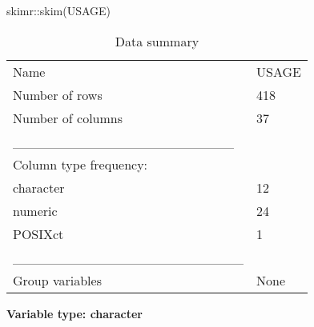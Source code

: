 \documentclass[
]{article}
\newenvironment{Shaded}{\begin{snugshade}}{\end{snugshade}}
\newcommand{\FunctionTok}[1]{\textcolor[rgb]{0.00,0.00,0.00}{#1}}
\newcommand{\NormalTok}[1]{#1}
\newcommand{\SpecialCharTok}[1]{\textcolor[rgb]{0.00,0.00,0.00}{#1}}
\begin{document}
\begin{Shaded}
\begin{Highlighting}[]
\NormalTok{skimr}\SpecialCharTok{::}\FunctionTok{skim}\NormalTok{(USAGE)}
\end{Highlighting}
\end{Shaded}

\begin{longtable}[]{@{}ll@{}}
\caption{Data summary}\tabularnewline
\toprule()
\endhead
Name & USAGE \\
Number of rows & 418 \\
Number of columns & 37 \\
\_\_\_\_\_\_\_\_\_\_\_\_\_\_\_\_\_\_\_\_\_\_\_ & \\
Column type frequency: & \\
character & 12 \\
numeric & 24 \\
POSIXct & 1 \\
\_\_\_\_\_\_\_\_\_\_\_\_\_\_\_\_\_\_\_\_\_\_\_\_ & \\
Group variables & None \\
\bottomrule()
\end{longtable}

\textbf{Variable type: character}
\end{document}
